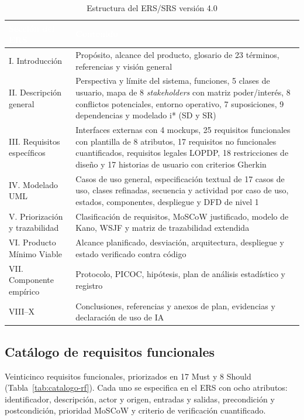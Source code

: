 \begin{table}[H]
\centering
\small
\begin{tabular}{|l|p{10.2cm}|}
\hline
\cellcolor{sigagreen}\textcolor{white}{\textbf{Secci\'on del ERS}} & \cellcolor{sigagreen}\textcolor{white}{\textbf{Contenido}} \\ \hline
I. Introducci\'on & Prop\'osito, alcance del producto, glosario de 23 t\'erminos, referencias y visi\'on general \\ \hline
II. Descripci\'on general & Perspectiva y l\'imite del sistema, funciones, 5 clases de usuario, mapa de 8 \emph{stakeholders} con matriz poder/inter\'es, 8 conflictos potenciales, entorno operativo, 7 suposiciones, 9 dependencias y modelado i* (SD y SR) \\ \hline
III. Requisitos espec\'ificos & Interfaces externas con 4 mockups, 25 requisitos funcionales con plantilla de 8 atributos, 17 requisitos no funcionales cuantificados, requisitos legales LOPDP, 18 restricciones de dise\~no y 17 historias de usuario con criterios Gherkin \\ \hline
IV. Modelado UML & Casos de uso general, especificaci\'on textual de 17 casos de uso, clases refinadas, secuencia y actividad por caso de uso, estados, componentes, despliegue y DFD de nivel 1 \\ \hline
V. Priorizaci\'on y trazabilidad & Clasificaci\'on de requisitos, MoSCoW justificado, modelo de Kano, WSJF y matriz de trazabilidad extendida \\ \hline
VI. Producto M\'inimo Viable & Alcance planificado, desviaci\'on, arquitectura, despliegue y estado verificado contra c\'odigo \\ \hline
VII. Componente emp\'irico & Protocolo, PICOC, hip\'otesis, plan de an\'alisis estad\'istico y registro \\ \hline
VIII--X & Conclusiones, referencias y anexos de plan, evidencias y declaraci\'on de uso de IA \\ \hline
\end{tabular}
\caption{Estructura del ERS/SRS versi\'on 4.0}
\label{tab:estructura-ers}
\end{table}

\subsection{Cat\'alogo de requisitos funcionales}

Veinticinco requisitos funcionales, priorizados en 17 Must y 8 Should (Tabla~\ref{tab:catalogo-rf}). Cada uno se especifica en el ERS con ocho atributos: identificador, descripci\'on, actor y origen, entradas y salidas, precondici\'on y postcondici\'on, prioridad MoSCoW y criterio de verificaci\'on cuantificado.

